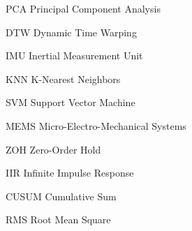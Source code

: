 \documentclass[tocnosub,noragright,centerchapter,12pt]{uiucecethesis09}
\begin{document}
\begin{symbollist*}
\item[PCA] Principal Component Analysis
\item[DTW] Dynamic Time Warping
\item[IMU] Inertial Measurement Unit
\item[KNN] K-Nearest Neighbors
\item[SVM] Support Vector Machine
\item[MEMS] Micro-Electro-Mechanical Systems
\item[ZOH] Zero-Order Hold
\item[IIR] Infinite Impulse Response
\item[CUSUM] Cumulative Sum
\item[RMS] Root Mean Square
\end{symbollist*}


%

\mainmatter

%









%
\appendix
%

\backmatter

%




\end{document}
